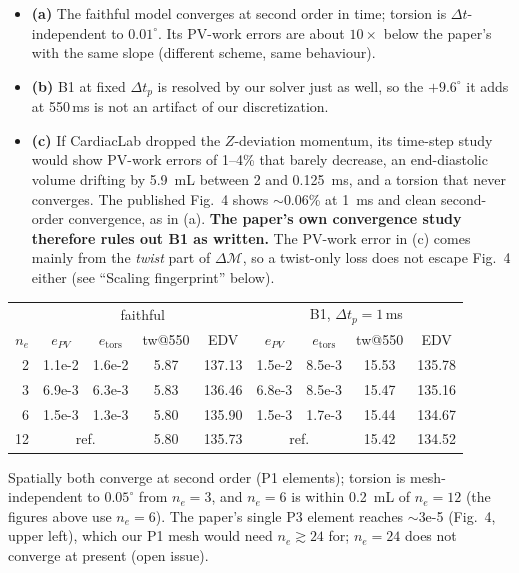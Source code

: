\documentclass[10pt]{article}
\begin{document}
\begin{itemize}
\item \textbf{(a)} The faithful model converges at second order in time; torsion is
  $\Delta t$-independent to $0.01^\circ$. Its PV-work errors are about $10\times$ below the
  paper's with the same slope (different scheme, same behaviour).
\item \textbf{(b)} B1 at fixed $\Delta t_p$ is resolved by our solver just as well, so the
  $+9.6^\circ$ it adds at 550\,ms is not an artifact of our discretization.
\item \textbf{(c)} If CardiacLab dropped the $Z$-deviation momentum, its time-step study would
  show PV-work errors of 1--4\% that barely decrease, an end-diastolic volume drifting by
  \SI{5.9}{mL} between 2 and \SI{0.125}{ms}, and a torsion that never converges. The
  published Fig.~4 shows $\sim$0.06\% at \SI{1}{ms} and clean second-order convergence, as in (a).
  \textbf{The paper's own convergence study therefore rules out B1 as written.} The PV-work
  error in (c) comes mainly from the \emph{twist} part of $\Delta\mathcal M$, so a twist-only
  loss does not escape Fig.~4 either (see ``Scaling fingerprint'' below).
\end{itemize}
\begin{center}\begin{tabular}{r|cccc|cccc}
\toprule
 & \multicolumn{4}{c|}{faithful} & \multicolumn{4}{c}{B1, $\Delta t_p{=}1$\,ms} \\
$n_e$ & $e_{PV}$ & $e_\text{tors}$ & tw@550 & EDV & $e_{PV}$ & $e_\text{tors}$ & tw@550 & EDV \\ \midrule
2  & 1.1e-2 & 1.6e-2 & 5.87 & 137.13 & 1.5e-2 & 8.5e-3 & 15.53 & 135.78 \\
3  & 6.9e-3 & 6.3e-3 & 5.83 & 136.46 & 6.8e-3 & 8.5e-3 & 15.47 & 135.16 \\
6  & 1.5e-3 & 1.3e-3 & 5.80 & 135.90 & 1.5e-3 & 1.7e-3 & 15.44 & 134.67 \\
12 & \multicolumn{2}{c}{ref.} & 5.80 & 135.73 & \multicolumn{2}{c}{ref.} & 15.42 & 134.52 \\
\bottomrule
\end{tabular}\end{center}
Spatially both converge at second order (P1 elements); torsion is mesh-independent to $0.05^\circ$
from $n_e=3$, and $n_e=6$ is within \SI{0.2}{mL} of $n_e=12$ (the figures above use $n_e=6$).
The paper's single P3 element reaches $\sim$3e-5 (Fig.~4, upper left), which our P1 mesh would
need $n_e\gtrsim24$ for; $n_e=24$ does not converge at present (open issue).
\end{document}
